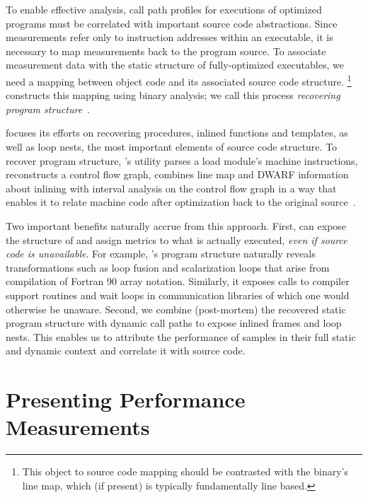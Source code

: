 \documentclass[11pt,letterpaper]{report}
\begin{document}
To enable effective analysis, call path profiles for executions of optimized programs must be correlated with important source code abstractions.
Since measurements refer only to instruction addresses within an executable, it is necessary to map measurements back to the program source.
To associate measurement data with the static structure of fully-optimized executables, we need a mapping between object code and its associated source code structure.%
\footnote{This object to source code mapping should be contrasted with the binary's line map, which (if present) is typically fundamentally line based.}
\HPCToolkit{} constructs this mapping using binary analysis; we call this process \emph{recovering program structure}~\cite{Tallent-MC-Fagan:2009:PLDI-hpctoolkit-binary-analysis}.

\HPCToolkit{} focuses its efforts on recovering procedures, inlined functions and templates, as well as  loop nests, the most important elements of source code structure.
To recover program structure, \HPCToolkit's \hpcstruct{} utility parses a load module's machine instructions, reconstructs a control flow graph, combines line map and DWARF information about inlining with interval analysis on the control flow graph in a way that enables it to relate machine code after optimization back to the original source~\cite{Tallent-MC-Fagan:2009:PLDI-hpctoolkit-binary-analysis}.

Two important benefits naturally accrue from this approach.
First, \HPCToolkit{} can expose the structure of and assign metrics to what is actually executed, \emph{even if source code is unavailable}.
For example, \hpcstruct{}'s program structure naturally reveals transformations such as loop fusion and scalarization loops that arise from compilation of Fortran 90 array notation.
Similarly, it exposes calls to compiler support routines and wait loops in communication libraries of which one would otherwise be unaware.
Second, we combine (post-mortem) the recovered static program structure with dynamic call paths to expose inlined frames and loop nests.
This enables us to attribute the performance of samples in their full static and dynamic context and correlate it with source code.


\section{Presenting Performance Measurements}
\end{document}
